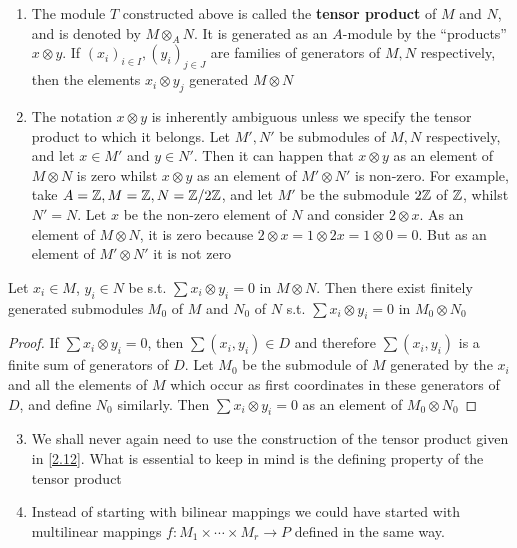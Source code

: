 \documentclass[11pt]{article}
\begin{document}
\begin{remark}
\begin{enumerate}
\item The module \(T\) constructed above is called the \textbf{tensor product} of \(M\) and \(N\), and is
denoted by \(M\otimes_AN\). It is generated as an \(A\)-module by the ``products'' \(x\otimes y\).
If \((x_i)_{i\in I},(y_i)_{j\in J}\) are families of generators of \(M,N\) respectively, then the
elements \(x_i\otimes y_j\) generated \(M\otimes N\)
\item The notation \(x\otimes y\) is inherently ambiguous unless we specify the tensor product to which
it belongs. Let \(M',N'\) be submodules of \(M,N\) respectively, and let \(x\in M'\)
and \(y\in N'\). Then it can happen that \(x\otimes y\) as an element of \(M\otimes N\) is zero
whilst \(x\otimes y\) as an element of \(M'\otimes N'\) is non-zero. For example,
take \(A=\mathbb{Z},M=\mathbb{Z},N=\mathbb{Z}/2\mathbb{Z}\), and let \(M'\) be the submodule \(2\mathbb{Z}\) of \(\mathbb{Z}\), whilst \(N'=N\).
Let \(x\) be the non-zero element of \(N\) and consider \(2\otimes x\). As an element
of \(M\otimes N\), it is zero because \(2\otimes x=1\otimes 2x=1\otimes 0=0\). But as an element of \(M'\otimes N'\) it is
not zero
\end{enumerate}
\end{remark}

\begin{corollary}[]
\label{2.13}
Let \(x_i\in M\), \(y_i\in N\) be s.t. \(\sum x_i\otimes y_i=0\) in \(M\otimes N\). Then there exist finitely generated
submodules \(M_0\) of \(M\) and \(N_0\) of \(N\) s.t. \(\sum x_i\otimes y_i=0\) in \(M_0\otimes N_0\)
\end{corollary}

\begin{proof}
If \(\sum x_i\otimes y_i=0\), then \(\sum(x_i,y_i)\in D\) and therefore \(\sum(x_i,y_i)\) is a finite sum of generators
of \(D\). Let \(M_0\) be the submodule of \(M\) generated by the \(x_i\) and all the elements
of \(M\) which occur as first coordinates in these generators of \(D\), and define \(N_0\)
similarly. Then \(\sum x_i\otimes y_i=0\) as an element of \(M_0\otimes N_0\)
\end{proof}


\begin{remark}
\begin{enumerate}
\setcounter{enumi}{2}
\item We shall never again need to use the construction of the tensor product given in
\ref{2.12}. What is essential to keep in mind is the defining property of the tensor product
\item Instead of starting with bilinear mappings we could have started with multilinear
mappings \(f:M_1\times\cdots\times M_r\to P\) defined in the same way.
\end{enumerate}
\end{remark}
\end{document}
